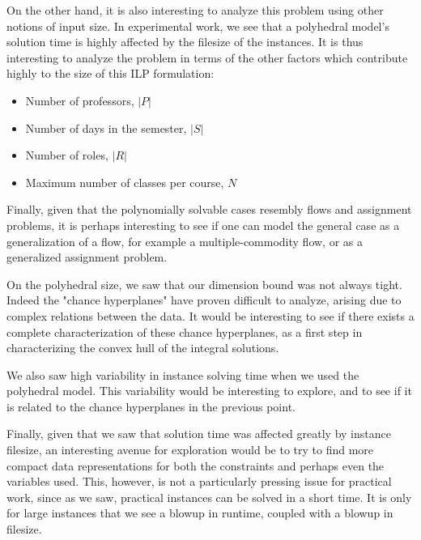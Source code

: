 On the other hand, it is also interesting to analyze this problem using other notions of input size. In experimental work, we see that a polyhedral model's solution time is highly affected by the filesize of the instances. It is thus interesting to analyze the problem in terms of the other factors which contribute highly to the size of this ILP formulation:

\begin{itemize}
\item Number of professors, $|P|$
\item Number of days in the semester, $|S|$
\item Number of roles, $|R|$
\item Maximum number of classes per course, $N$
\end{itemize}

Finally, given that the polynomially solvable cases resembly flows and assignment problems, it is perhaps interesting to see if one can model the general case as a generalization of a flow, for example a multiple-commodity flow, or as a generalized assignment problem.

On the polyhedral size, we saw that our dimension bound was not always tight. Indeed the "chance hyperplanes" have proven difficult to analyze, arising due to complex relations between the data. It would be interesting to see if there exists a complete characterization of these chance hyperplanes, as a first step in characterizing the convex hull of the integral solutions.

We also saw high variability in instance solving time when we used the polyhedral model. This variability would be interesting to explore, and to see if it is related to the chance hyperplanes in the previous point.

Finally, given that we saw that solution time was affected greatly by instance filesize, an interesting avenue for exploration would be to try to find more compact data representations for both the constraints and perhaps even the variables used. This, however, is not a particularly pressing issue for practical work, since as we saw, practical instances can be solved in a short time. It is only for large instances that we see a blowup in runtime, coupled with a blowup in filesize.
